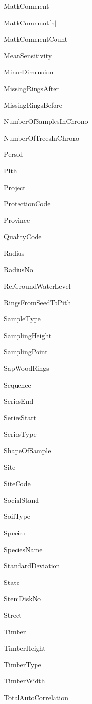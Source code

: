 \begin{multicols}{2}
\begin{itemize*}
 \item  MathComment
 \item  MathComment[n]
 \item  MathCommentCount
 \item  MeanSensitivity
 \item  MinorDimension
 \item  MissingRingsAfter
 \item  MissingRingsBefore
 \item  NumberOfSamplesInChrono
 \item  NumberOfTreesInChrono
 \item  PersId
 \item  Pith
 \item  Project
 \item  ProtectionCode
 \item  Province
 \item  QualityCode
 \item  Radius
 \item  RadiusNo
 \item  RelGroundWaterLevel
 \item  RingsFromSeedToPith
 \item  SampleType
 \item  SamplingHeight
 \item  SamplingPoint
 \item  SapWoodRings
 \item  Sequence
 \item  SeriesEnd
 \item  SeriesStart
 \item  SeriesType
 \item  ShapeOfSample
 \item  Site
 \item  SiteCode
 \item  SocialStand
 \item  SoilType
 \item  Species
 \item  SpeciesName
 \item  StandardDeviation
 \item  State
 \item  StemDiskNo
 \item  Street
 \item  Timber
 \item  TimberHeight
 \item  TimberType
 \item  TimberWidth
 \item  TotalAutoCorrelation

\end{itemize*}
\end{multicols}
